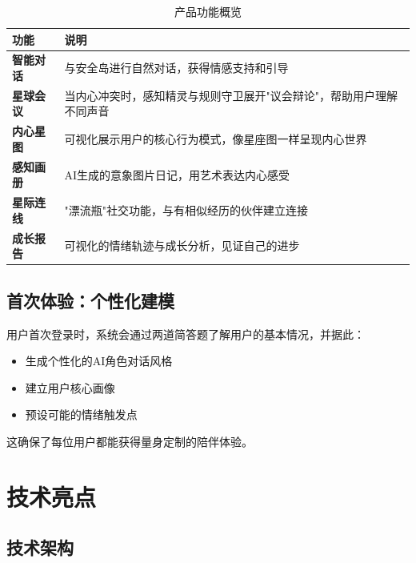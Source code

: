 \documentclass[12pt,a4paper]{article}
\begin{document}
\begin{table}[H]
\centering
\begin{tabular}{>{\bfseries}l p{7.5cm}}
\toprule
\textbf{功能} & \textbf{说明} \\
\midrule
智能对话 & 与安全岛进行自然对话，获得情感支持和引导 \\
星球会议 & 当内心冲突时，感知精灵与规则守卫展开"议会辩论"，帮助用户理解不同声音 \\
内心星图 & 可视化展示用户的核心行为模式，像星座图一样呈现内心世界 \\
感知画册 & AI生成的意象图片日记，用艺术表达内心感受 \\
星际连线 & "漂流瓶"社交功能，与有相似经历的伙伴建立连接 \\
成长报告 & 可视化的情绪轨迹与成长分析，见证自己的进步 \\
\bottomrule
\end{tabular}
\caption{产品功能概览}
\end{table}

\subsection{首次体验：个性化建模}

用户首次登录时，系统会通过两道简答题了解用户的基本情况，并据此：
\begin{itemize}[leftmargin=*]
    \item 生成个性化的AI角色对话风格
    \item 建立用户核心画像
    \item 预设可能的情绪触发点
\end{itemize}

这确保了每位用户都能获得量身定制的陪伴体验。

\section{技术亮点}

\subsection{技术架构}
\end{document}
